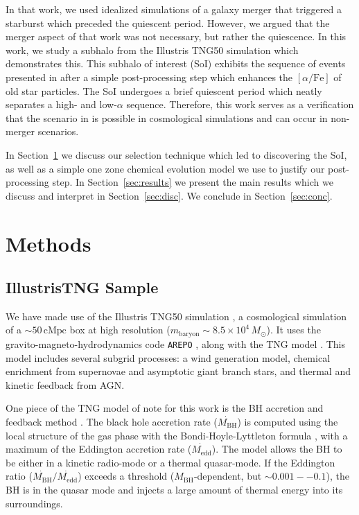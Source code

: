 \documentclass[linenumbers, twocolumn]{aastex631}
\newcommand{\Msun}{\ensuremath{M_{\odot}}}
\newcommand{\alphaFe}{\ensuremath{[\alpha/\textrm{Fe}]}}
\begin{document}
In that work, we used idealized simulations of a galaxy merger that triggered a starburst which preceded the quiescent period. However, we argued that the merger aspect of that work was not necessary, but rather the quiescence. In this work, we study a subhalo from the Illustris TNG50 simulation which demonstrates this. This subhalo of interest (SoI) exhibits the sequence of events presented in \citet{2024arXiv240707985B} after a simple post-processing step which enhances the \alphaFe{} of old star particles. The SoI undergoes a brief quiescent period which neatly separates a high- and low-$\alpha$ sequence. Therefore, this work serves as a verification that the scenario in \citet{2024arXiv240707985B} is possible in cosmological simulations and can occur in non-merger scenarios.

In Section~\ref{sec:methods} we discuss our selection technique which led to discovering the SoI, as well as a simple one zone chemical evolution model we use to justify our post-processing step. In Section~\ref{sec:results} we present the main results which we discuss and interpret in Section~\ref{sec:disc}. We conclude in Section~\ref{sec:conc}.


\section{Methods}\label{sec:methods}
\subsection{IllustrisTNG Sample}\label{ssec:tng}
We have made use of the Illustris TNG50 simulation \citep{2019MNRAS.490.3196P, 2019MNRAS.490.3234N}, a cosmological simulation of a $\sim50\,\textrm{cMpc}$ box at high resolution ($m_{\textrm{baryon}}\sim8.5\times10^4\,\Msun$). It uses the gravito-magneto-hydrodynamics code \texttt{AREPO} \citep{2010MNRAS.401..791S, 2016MNRAS.455.1134P}, along with the TNG model \citep{2013MNRAS.436.3031V, 2017MNRAS.465.3291W, 2018MNRAS.473.4077P}. This model includes several subgrid processes: a wind generation model, chemical enrichment from supernovae and asymptotic giant branch stars, and thermal and kinetic feedback from AGN.

One piece of the TNG model of note for this work is the BH accretion and feedback method \citep{2017MNRAS.465.3291W}. The black hole accretion rate ($\dot{M_{\textrm{BH}}}$) is computed using the local structure of the gas phase with the Bondi-Hoyle-Lyttleton formula \citep{1939PCPS...35..405H,1944MNRAS.104..273B,1952MNRAS.112..195B}, with a maximum of the Eddington accretion rate ($\dot{M_{\textrm{edd}}}$). The model allows the BH to be either in a kinetic radio-mode or a thermal quasar-mode. If the Eddington ratio ($\dot{M_{\textrm{BH}}}/\dot{M_{\textrm{edd}}}$) exceeds a threshold ($M_{\textrm{BH}}$-dependent, but $\sim0.001--0.1$), the BH is in the quasar mode and injects a large amount of thermal energy into its surroundings.
\end{document}
